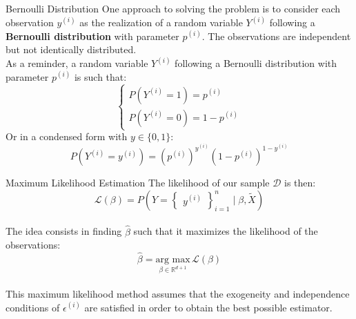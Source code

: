 \begin{frame}{Bernoulli Distribution}
	One approach to solving the problem is to consider each observation $y^{(i)}$ as the realization of a random variable $Y^{(i)}$ following a \textbf{Bernoulli distribution} with parameter $p^{(i)}$. The observations are independent but not identically distributed.\\
	\vspace{0.5cm}
	\pause
	As a reminder, a random variable $Y^{(i)}$ following a Bernoulli distribution with parameter $p^{(i)}$ is such that:
	\begin{equation*}
		\begin{cases}
			P(Y^{(i)} = 1) = p^{(i)} \\
			P(Y^{(i)} = 0) = 1 - p^{(i)}
		\end{cases}
	\end{equation*}
	Or in a condensed form with $y \in \{0, 1\}$:
	\begin{equation*}
		P(Y^{(i)} = y^{(i)}) = \left(p^{(i)}\right)^{y^{(i)}} \left(1 - p^{(i)}\right)^{1 - y^{(i)}}
	\end{equation*}
\end{frame}
	
\begin{frame}{Maximum Likelihood Estimation}
	The likelihood of our sample $\mathcal{D}$ is then:
	\begin{equation}
		\mathcal{L}(\beta) = P(Y = \begin{Bmatrix}y^{(i)}\end{Bmatrix}_{i=1}^n \mid \beta, \tilde{X})
		\nonumber
	\end{equation} \\
	\vspace{0.5cm}
	\pause
	The idea consists in finding $\hat{\beta}$ such that it maximizes the likelihood of the observations:
	\begin{equation}
		\hat{\beta} = \underset{\beta \in \mathbb{R}^{d+1}}{\text{arg max}} \, \mathcal{L}(\beta)
		\nonumber
	\end{equation} \\
	\vspace{0.5cm}
	\pause
	This maximum likelihood method assumes that the exogeneity and independence conditions of $\epsilon^{(i)}$ are satisfied in order to obtain the best possible estimator.
\end{frame}

